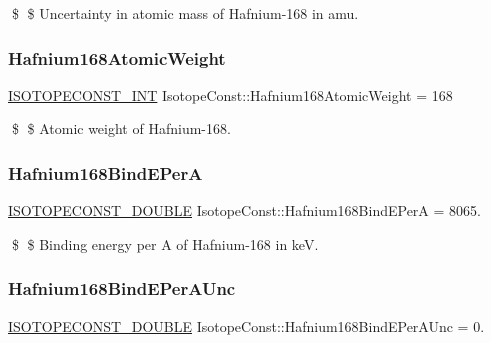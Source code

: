 \$ \$ Uncertainty in atomic mass of Hafnium-\/168 in amu. \mbox{\label{group___isotope_const-_hafnium-_hf168_ga3f403405a89510a4f251a5ccedfcdcb6}} 
\subsubsection{\texorpdfstring{Hafnium168\+Atomic\+Weight}{Hafnium168AtomicWeight}}
{\footnotesize\ttfamily \mbox{\hyperlink{group___isotope_const-_macros_ga5f18360b3e99483a35c32d789e62621c}{I\+S\+O\+T\+O\+P\+E\+C\+O\+N\+S\+T\+\_\+\+I\+NT}} Isotope\+Const\+::\+Hafnium168\+Atomic\+Weight = 168}

\$ \$ Atomic weight of Hafnium-\/168. \mbox{\label{group___isotope_const-_hafnium-_hf168_ga2b76d4335e535df2e19efabbe16c59a9}} 
\subsubsection{\texorpdfstring{Hafnium168\+Bind\+E\+PerA}{Hafnium168BindEPerA}}
{\footnotesize\ttfamily \mbox{\hyperlink{group___isotope_const-_macros_ga8f45a7272ce02c0b4c65c44636ed719a}{I\+S\+O\+T\+O\+P\+E\+C\+O\+N\+S\+T\+\_\+\+D\+O\+U\+B\+LE}} Isotope\+Const\+::\+Hafnium168\+Bind\+E\+PerA = 8065.}

\$ \$ Binding energy per A of Hafnium-\/168 in keV. \mbox{\label{group___isotope_const-_hafnium-_hf168_ga42fd21d7b0a061cf05d0e2aee942b213}} 
\subsubsection{\texorpdfstring{Hafnium168\+Bind\+E\+Per\+A\+Unc}{Hafnium168BindEPerAUnc}}
{\footnotesize\ttfamily \mbox{\hyperlink{group___isotope_const-_macros_ga8f45a7272ce02c0b4c65c44636ed719a}{I\+S\+O\+T\+O\+P\+E\+C\+O\+N\+S\+T\+\_\+\+D\+O\+U\+B\+LE}} Isotope\+Const\+::\+Hafnium168\+Bind\+E\+Per\+A\+Unc = 0.}

